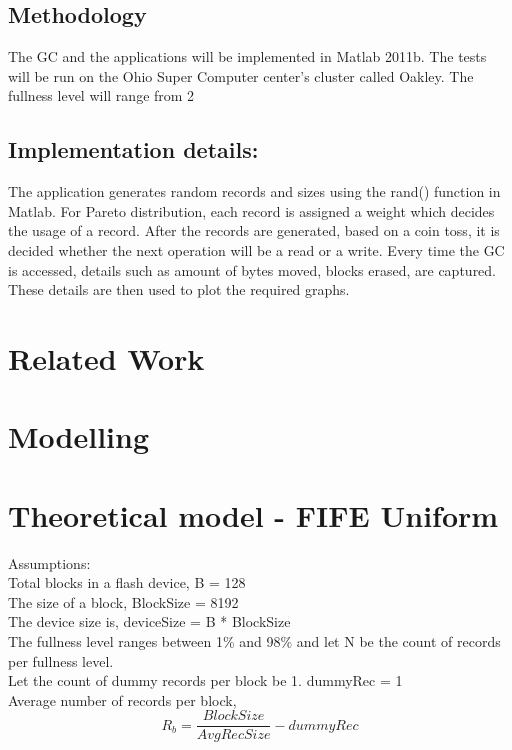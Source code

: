 \documentclass[11pt]{report} %
\begin{document}
\subsection{Methodology}
The GC and the applications will be implemented in Matlab 2011b. The tests will be run on the Ohio Super Computer center’s cluster called Oakley. The fullness level will range from 2%

\subsection*{Implementation details:}
The application generates random records and sizes using the rand() function in Matlab. For Pareto distribution, each record is assigned a weight which decides the usage of a record. After the records are generated, based on a coin toss, it is decided whether the next operation will be a read or a write. Every time the GC is accessed, details such as amount of bytes moved, blocks erased, are captured. These details are then used to plot the required graphs. 

\section{Related Work}

\section{Modelling}

\section{Theoretical model - FIFE Uniform}

Assumptions:\\
Total blocks in a flash device, B = 128\\
The size of a block, BlockSize = 8192\\
The device size is, deviceSize = B * BlockSize\\
The fullness level ranges between 1\% and 98\% and let N be the count of records per fullness level.\\
Let the count of dummy records per block be 1. dummyRec = 1\\
Average number of records per block, 
\begin{equation}R_b = \frac{BlockSize}{AvgRecSize} - dummyRec\end{equation}\\
\end{document}
